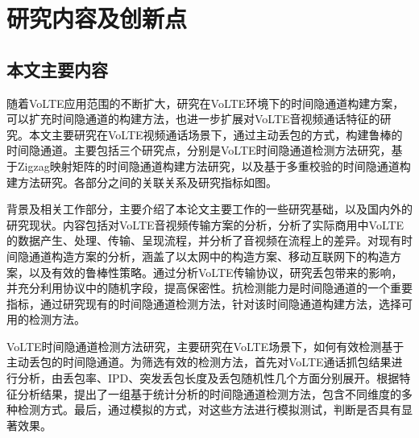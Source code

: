 \section{研究内容及创新点}
\label{sec:intro:work}

\subsection{本文主要内容}
\label{sec:intro:work:mainwork}

随着VoLTE应用范围的不断扩大，研究在VoLTE环境下的时间隐通道构建方案，可以扩充时间隐通道的构建方法，也进一步扩展对VoLTE音视频通话特征的研究。本文主要研究在VoLTE视频通话场景下，通过主动丢包的方式，构建鲁棒的时间隐通道。主要包括三个研究点，分别是VoLTE时间隐通道检测方法研究，基于Zigzag映射矩阵的时间隐通道构建方法研究，以及基于多重校验的时间隐通道构建方法研究。各部分之间的关联关系及研究指标如图。


背景及相关工作部分，主要介绍了本论文主要工作的一些研究基础，以及国内外的研究现状。内容包括对VoLTE音视频传输方案的分析，分析了实际商用中VoLTE的数据产生、处理、传输、呈现流程，并分析了音视频在流程上的差异。对现有时间隐通道构造方案的分析，涵盖了以太网中的构造方案、移动互联网下的构造方案，以及有效的鲁棒性策略。通过分析VoLTE传输协议，研究丢包带来的影响，并充分利用协议中的随机字段，提高保密性。抗检测能力是时间隐通道的一个重要指标，通过研究现有的时间隐通道检测方法，针对该时间隐通道构建方法，选择可用的检测方法。

VoLTE时间隐通道检测方法研究，主要研究在VoLTE场景下，如何有效检测基于主动丢包的时间隐通道。为筛选有效的检测方法，首先对VoLTE通话抓包结果进行分析，由丢包率、IPD、突发丢包长度及丢包随机性几个方面分别展开。根据特征分析结果，提出了一组基于统计分析的时间隐通道检测方法，包含不同维度的多种检测方式。最后，通过模拟的方式，对这些方法进行模拟测试，判断是否具有显著效果。

